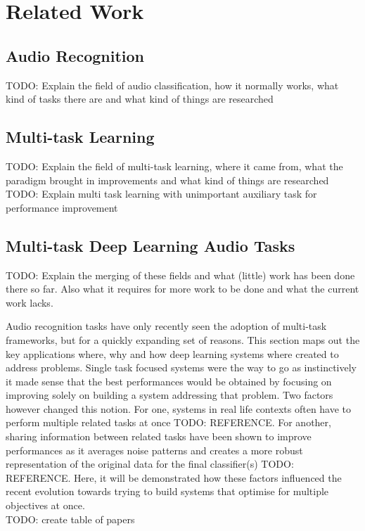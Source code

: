 \chapter{Related Work}

\section{Audio Recognition}
TODO: Explain the field of audio classification, how it normally works, what kind of tasks there are and what kind of things are researched

\section{Multi-task Learning}
TODO: Explain the field of multi-task learning, where it came from, what the paradigm brought in improvements and what kind of things are researched
TODO: Explain multi task learning with unimportant auxiliary task for performance improvement

\section{Multi-task Deep Learning Audio Tasks}
TODO: Explain the merging of these fields and what (little) work has been done there so far. Also what it requires for more work to be done and what the current work lacks.

Audio recognition tasks have only recently seen the adoption of multi-task frameworks, but for a quickly expanding set of reasons. This section maps out the key applications where, why and how deep learning systems where created to address problems. Single task focused systems were the way to go as instinctively it made sense that the best performances would be obtained by focusing on improving solely on building a system addressing that problem. Two factors however changed this notion. For one, systems in real life contexts often have to perform multiple related tasks at once TODO: REFERENCE. For another, sharing information between related tasks have been shown to improve performances as it averages noise patterns and creates a more robust representation of the original data for the final classifier(s) TODO: REFERENCE. Here, it will be demonstrated how these factors influenced the recent evolution towards trying to build systems that optimise for multiple objectives at once.\\

TODO: create table of papers

